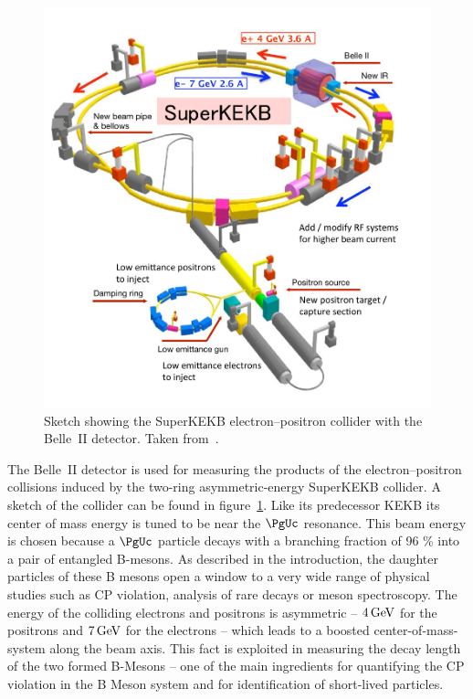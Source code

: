 \begin{figure}
 \centering
 \includegraphics[height=0.4\textheight]{figures/experimental_setup/superkekb.jpg}
 \caption[Sketch showing the SuperKEKB electron--positron collider.]{Sketch showing the SuperKEKB electron--positron collider with the Belle~II detector. Taken from~\cite{DesyWebseite}.}
 \label{fig-superkekb}
\end{figure}


The Belle~II detector is used for measuring the products of the electron--positron collisions induced by the two-ring asymmetric-energy SuperKEKB collider. A sketch of the collider can be found in figure~\ref{fig-superkekb}. Like its predecessor KEKB its center of mass energy is tuned to be near the $\PgUc$ resonance. This beam energy is chosen because a $\PgUc$ particle decays with a branching fraction of 96 \% into a pair of entangled B-mesons. As described in the introduction, the daughter particles of these B mesons open a window to a very wide range of physical studies such as CP violation, analysis of rare decays or meson spectroscopy. The energy of the colliding electrons and positrons is asymmetric -- $\unit[4]{GeV}$ for the positrons and $\unit[7]{GeV}$ for the electrons -- which leads to a boosted center-of-mass-system along the beam axis. This fact is exploited in measuring the decay length of the two formed B-Mesons -- one of the main ingredients for quantifying the CP violation in the B Meson system and for identification of short-lived particles. 

